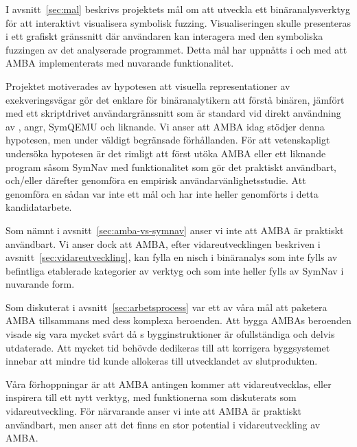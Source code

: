 I avsnitt~\ref{sec:mal} beskrivs projektets mål om att utveckla ett
binäranalysverktyg för att interaktivt visualisera symbolisk fuzzing.
Visualiseringen skulle presenteras i ett grafiskt gränssnitt där användaren kan
interagera med den symboliska fuzzingen av det analyserade programmet. Detta mål
har uppnåtts i och med att AMBA implementerats med nuvarande funktionalitet.

Projektet motiverades av hypotesen att visuella representationer av
exekveringsvägar gör det enklare för binäranalytikern att förstå binären,
jämfört med ett skriptdrivet användargränssnitt som är standard vid direkt
användning av \stoe{}, angr, SymQEMU och liknande. Vi anser att AMBA idag
stödjer denna hypotesen, men under väldigt begränsade förhållanden. För att
vetenskapligt undersöka hypotesen är det rimligt att först utöka AMBA eller ett
liknande program såsom SymNav med funktionalitet som gör det praktiskt
användbart, och/eller därefter genomföra en empirisk användarvänlighetsstudie.
Att genomföra en sådan var inte ett mål och har inte heller genomförts i detta
kandidatarbete.

Som nämnt i avsnitt~\ref{sec:amba-vs-symnav} anser vi inte att AMBA är praktiskt
användbart. Vi anser dock att AMBA, efter vidareutvecklingen beskriven i
avsnitt~\ref{sec:vidareutveckling}, kan fylla en nisch i binäranalys som inte
fylls av befintliga etablerade kategorier av verktyg och som inte heller fylls
av SymNav i nuvarande form.

Som diskuterat i avsnitt~\ref{sec:arbetsprocess} var ett av våra mål att
paketera AMBA tillsammans med dess komplexa beroenden. Att bygga AMBAs beroenden
visade sig vara mycket svårt då \stoe{}s bygginstruktioner är ofullständiga och
delvis utdaterade. Att mycket tid behövde dedikeras till att korrigera
byggsystemet innebar att mindre tid kunde allokeras till utvecklandet av
slutprodukten.

Våra förhoppningar är att AMBA antingen kommer att vidareutvecklas, eller
inspirera till ett nytt verktyg, med funktionerna som diskuterats som
vidareutveckling. För närvarande anser vi inte att AMBA är praktiskt användbart,
men anser att det finns en stor potential i vidareutveckling av AMBA.\@
